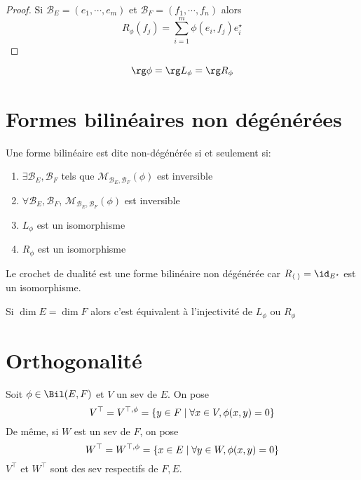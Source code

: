 \begin{proof}
    Si $\mathcal  B_E=(e_1, \cdots , e_m)$ et $\mathcal  B_F=(f_1, \cdots , f_n)$ alors \[
        R_\phi(f_j)=\sum_{i=1}^m \phi(e_i, f_j)e_i^\star
    \] 
\end{proof}

\begin{cor}
\[
\rg \phi=\rg L_\phi=\rg R_\phi
\] 
\end{cor}

\section{Formes bilinéaires non dégénérées}

\begin{prop}
    Une forme bilinéaire est dite non-dégénérée si et seulement si: \begin{enumerate}
        \item $\exists  \mathcal  B_E, \mathcal  B_F$ tels que $\mathcal  M_{\mathcal  B_E, \mathcal  B_F}(\phi)$ est inversible
        \item $\forall  \mathcal  B_E, \mathcal  B_F$, $\mathcal  M_{\mathcal  B_E, \mathcal  B_F}(\phi)$ est inversible
        \item $L_\phi$ est un isomorphisme
        \item  $R_\phi$ est un isomorphisme
    \end{enumerate}
\end{prop}

\begin{ex}
Le crochet de dualité est une forme bilinéaire non dégénérée car $R_{\langle\;\rangle}=\id_{E^\star}$ est un isomorphisme.
\end{ex}

\begin{rem}
Si $\dim E=\dim F$ alors c'est équivalent à l'injectivité de  $L_\phi$ ou  $R_\phi$
\end{rem}

\section{Orthogonalité}

\begin{dfn}
    Soit $\phi \in  \Bil(E, F)$ et $V$ un sev de $E$. On pose \[
        V^\top = V^{\top, \phi}= \left\{ y \in  F \suchthat \forall  x  \in  V, \phi(x, y)=0 \right\} 
    \] 
    De même, si $W$ est un sev de $F$, on pose \[
        W^\top = W^{\top, \phi}= \left\{ x \in  E \suchthat \forall  y  \in  W, \phi(x, y)=0 \right\} 
    \] 
    $V^\top$ et $W^\top$ sont des sev respectifs de $F, E$.
\end{dfn}


